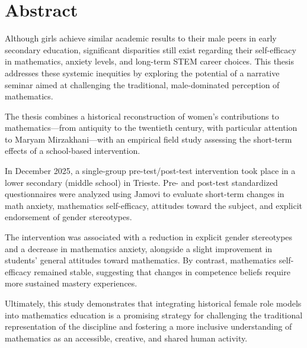 \chapter{Abstract}

Although girls achieve similar academic results to their male peers in early secondary education, significant disparities still exist regarding their self-efficacy in mathematics, anxiety levels, and long-term STEM career choices. This thesis addresses these systemic inequities by exploring the potential of a narrative seminar aimed at challenging the traditional, male-dominated perception of mathematics.

The thesis combines a historical reconstruction of women's contributions to mathematics—from antiquity to the twentieth century, with particular attention to Maryam Mirzakhani—with an empirical field study assessing the short-term effects of a school-based intervention.

In December 2025, a single-group pre-test/post-test intervention took place in a lower secondary (middle school) in Trieste. Pre- and post-test standardized questionnaires were analyzed using Jamovi to evaluate short-term changes in math anxiety, mathematics self-efficacy, attitudes toward the subject, and explicit endorsement of gender stereotypes.

The intervention was associated with a reduction in explicit gender stereotypes and a decrease in mathematics anxiety, alongside a slight improvement in students' general attitudes toward mathematics. By contrast, mathematics self-efficacy remained stable, suggesting that changes in competence beliefs require more sustained mastery experiences.

Ultimately, this study demonstrates that integrating historical female role models into mathematics education is a promising strategy for challenging the traditional representation of the discipline and fostering a more inclusive understanding of mathematics as an accessible, creative, and shared human activity.
